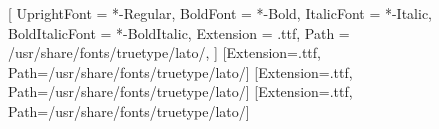
\setmainfont{TeX Gyre Pagella}
\setsansfont{Lato}[
  UprightFont = *-Regular,
  BoldFont = *-Bold,
  ItalicFont = *-Italic,
  BoldItalicFont = *-BoldItalic,
  Extension = .ttf,
  Path = /usr/share/fonts/truetype/lato/,
]
\newfontfamily{}[Extension=.ttf, Path=/usr/share/fonts/truetype/lato/]
\newfontfamily{}[Extension=.ttf, Path=/usr/share/fonts/truetype/lato/]
\newfontfamily{}[Extension=.ttf, Path=/usr/share/fonts/truetype/lato/]
\frenchspacing

\color{hbink}

\usepackage{etoolbox}
\usepackage{fancyhdr}
\usepackage{titlesec}
\usepackage{enumitem}
\usepackage[most]{tcolorbox}
\usepackage{needspace}
\usepackage{tikz}
\usetikzlibrary{calc}
\usepackage{multicol}
\usepackage{tabularx}
\usepackage{colortbl}
\usepackage{xurl}

\def\UrlBigBreaks{\do\/\do\.\do\-\do\_\do\=\do\&\do\?\do\#\do\:\do\;\do\,\do\!\do\|\do\)\do\]\do+}
\def\UrlBreaks{\do\a\do\b\do\c\do\d\do\e\do\f\do\g\do\h\do\i\do\j\do\k\do\l\do\m%
  \do\n\do\o\do\p\do\q\do\r\do\s\do\t\do\u\do\v\do\w\do\x\do\y\do\z%
  \do\A\do\B\do\C\do\D\do\E\do\F\do\G\do\H\do\I\do\J\do\K\do\L\do\M%
  \do\N\do\O\do\P\do\Q\do\R\do\S\do\T\do\U\do\V\do\W\do\X\do\Y\do\Z%
  \do0\do1\do2\do3\do4\do5\do6\do7\do8\do9}
\mathchardef{}
\mathchardef{}

\setlength{\parindent}{0pt}
\setlength{\parskip}{0.55em plus 0.15em minus 0.1em}
\linespread{1.06}
\raggedbottom

